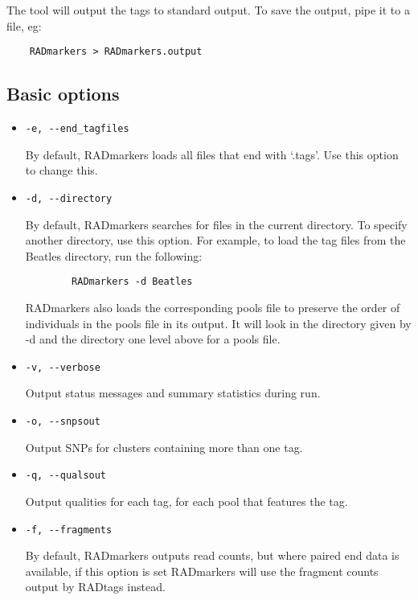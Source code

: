 \documentclass[a4paper]{article}
\begin{document}
The tool will output the tags to standard output. To save the output, pipe it to a file, eg:

\begin{verbatim}
    RADmarkers > RADmarkers.output
\end{verbatim}

\subsection{Basic options}

\begin{itemize}
    \item \verb|-e, --end_tagfiles|
    
    By default, RADmarkers loads all files that end with `.tags'. Use this option to change this.
    
    \item \verb|-d, --directory|
    
    By default, RADmarkers searches for files in the current directory. To specify another directory, use this option. For example, to load the tag files from the Beatles directory, run the following:
    
    \begin{verbatim}
        RADmarkers -d Beatles
    \end{verbatim}
    
    RADmarkers also loads the corresponding pools file to preserve the order of individuals in the pools file in its output. It will look in the directory given by -d and the directory one level above for a pools file.

    \item \verb|-v, --verbose|
    
    Output status messages and summary statistics during run.
    
    \item \verb|-o, --snpsout|
    
    Output SNPs for clusters containing more than one tag.
    
    \item \verb|-q, --qualsout|
    
    Output qualities for each tag, for each pool that features the tag.

    \item \verb|-f, --fragments|
    
    By default, RADmarkers outputs read counts, but where paired end data is available, if this option is set RADmarkers will use the fragment counts output by RADtags instead.

\end{itemize}
\end{document}
